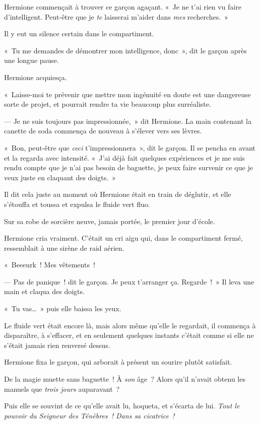 Hermione commençait à trouver ce garçon agaçant. «~Je ne t'ai rien vu faire d'intelligent. Peut-être que je \emph{te} laisserai m'aider dans \emph{mes} recherches.~»

Il y eut un silence certain dans le compartiment.

«~Tu me demandes de démontrer mon intelligence, donc~», dit le garçon après une longue pause.

Hermione acquiesça.

«~Laisse-moi te prévenir que mettre mon ingénuité en doute est une dangereuse sorte de projet, et pourrait rendre ta vie beaucoup plus surréaliste.

--- Je ne suis toujours pas impressionnée,~» dit Hermione. La main contenant la canette de soda commença de nouveau à s'élever vers ses lèvres.

«~Bon, peut-être que \emph{ceci} t'impressionnera~», dit le garçon. Il se pencha en avant et la regarda avec intensité. «~J'ai déjà fait quelques expériences et je me suis rendu compte que je n'ai pas besoin de baguette, je peux faire survenir ce que je veux juste en claquant des doigts.~»

Il dit cela juste au moment où Hermione était en train de déglutir, et elle s'étouffa et toussa et expulsa le fluide vert fluo.

Sur sa robe de sorcière neuve, jamais portée, le premier jour d'école.

Hermione cria vraiment. C'était un cri aigu qui, dans le compartiment fermé, ressemblait à une sirène de raid aérien.

«~Beeeurk~! Mes vêtements~!

--- Pas de panique~! dit le garçon. Je peux t'arranger ça. Regarde~!~» Il leva une main et claqua des doigts.

«~Tu vas…~» puis elle baissa les yeux.

Le fluide vert était encore là, mais alors même qu'elle le regardait, il commença à disparaître, à s'effacer, et en seulement quelques instants c'était comme si elle ne s'était jamais rien renversé dessus.

Hermione fixa le garçon, qui arborait à présent un sourire plutôt satisfait.

De la magie muette sans baguette~! À \emph{son} âge~? Alors qu'il n'avait obtenu les manuels que \emph{trois jours} auparavant~?

Puis elle se souvint de ce qu'elle avait lu, hoqueta, et s'écarta de lui. \emph{Tout le pouvoir du Seigneur des Ténèbres~! Dans sa cicatrice~!}

